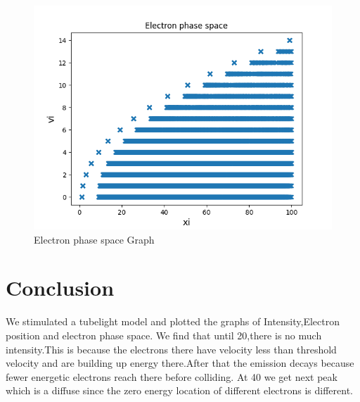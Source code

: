 \documentclass[12pt, a4paper]{article}
\begin{document}
\begin{figure}[!tbh]
\centering
\includegraphics[scale=0.70]{Plot1.png}
\caption{Electron phase space Graph}
\label{Figure3}
\end{figure}


\section*{Conclusion}
We stimulated a tubelight model and plotted the graphs of Intensity,Electron position and electron phase space. We find that until 20,there is no much intensity.This is because the electrons there have velocity less than threshold velocity and are building up energy there.After that the emission decays because fewer energetic electrons reach there before colliding. At 40 we get next peak which is a diffuse since the zero energy location of different electrons is different.
\end{document}
